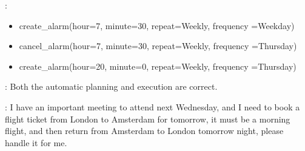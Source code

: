 :
\begin{itemize}
    \item create\_alarm(hour=7, minute=30, repeat=Weekly, frequency =Weekday)
    \item cancel\_alarm(hour=7, minute=30, repeat=Weekly, frequency =Thursday)
    \item create\_alarm(hour=20, minute=0, repeat=Weekly, frequency =Thursday)
\end{itemize}

: Both the automatic planning and execution are correct.

: I have an important meeting to attend next Wednesday, and I need to book a flight ticket from London to Amsterdam for tomorrow, it must be a morning flight, and then return from
Amsterdam to London tomorrow night, please handle it for me.

